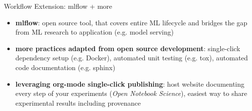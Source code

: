 \documentclass[10pt,aspectratio=169]{beamer}
\begin{document}
\begin{frame}{Workflow Extension: mlflow + more}
    \begin{itemize}[<+->]
        \item \textbf{mlflow}: open source tool, that covers entire ML lifecycle and bridges the gap from ML research to application (e.g. model serving)
        \item \textbf{more practices adapted from open source development}: single-click dependency setup (e.g. Docker), automated unit testing (e.g. tox), automated code documentation (e.g. sphinx)
        \item \textbf{leveraging org-mode single-click publishing}: host website documenting every step of your experiments (\textit{Open Notebook Science}), easiest way to share experimental results including provenance
    \end{itemize}
\end{frame}
\end{document}
